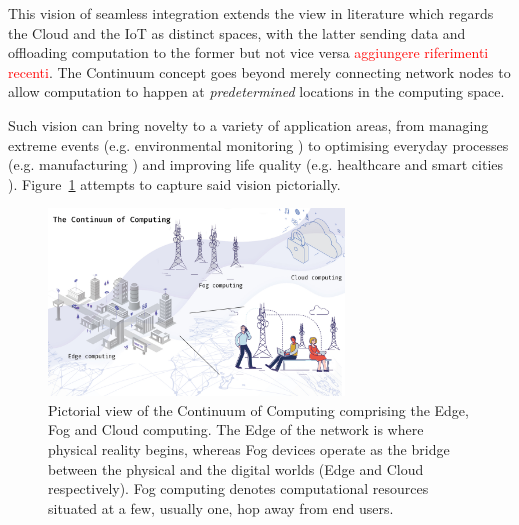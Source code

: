 This vision of seamless integration extends the view in literature which regards the Cloud and the IoT as distinct spaces, with the latter sending data and offloading computation to the former but not vice versa \textcolor{red}{aggiungere riferimenti recenti}. The Continuum concept goes beyond merely connecting network nodes to allow computation to happen at \textit{predetermined} locations in the computing space.

Such vision can bring novelty to a variety of application areas, from managing extreme events (e.g. environmental monitoring \cite{brzoza2016embedded}) to optimising everyday processes (e.g. manufacturing \cite{chen2018edge}) and improving life quality (e.g. healthcare \cite{pace2018edge} and smart cities \cite{he2017multitier}).
Figure~\ref{fig:continuum} attempts to capture said vision pictorially. 
\begin{figure}[ht]
\centering
\includegraphics[width=0.7\textwidth]{figures/continuum}
\caption{Pictorial view of the Continuum of Computing comprising the Edge, Fog and Cloud computing. The Edge of the network is where physical reality begins, whereas Fog devices operate as the bridge between the physical and the digital worlds (Edge and Cloud respectively). Fog computing denotes computational resources situated at a few, usually one, hop away from end users.}
\label{fig:continuum}
\end{figure}


